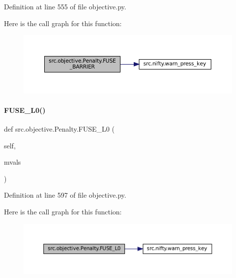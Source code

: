Definition at line 555 of file objective.\+py.

Here is the call graph for this function\+:
\nopagebreak
\begin{figure}[H]
\begin{center}
\leavevmode
\includegraphics[width=350pt]{classsrc_1_1objective_1_1Penalty_abb8686b72c5850e731ec5a96003a9237_cgraph}
\end{center}
\end{figure}
\mbox{\label{classsrc_1_1objective_1_1Penalty_a02a8b3d6848053c479808332cee91777}} 
\paragraph{\texorpdfstring{F\+U\+S\+E\+\_\+\+L0()}{FUSE\_L0()}}
{\footnotesize\ttfamily def src.\+objective.\+Penalty.\+F\+U\+S\+E\+\_\+\+L0 (\begin{DoxyParamCaption}\item[{}]{self,  }\item[{}]{mvals }\end{DoxyParamCaption})}



Definition at line 597 of file objective.\+py.

Here is the call graph for this function\+:
\nopagebreak
\begin{figure}[H]
\begin{center}
\leavevmode
\includegraphics[width=350pt]{classsrc_1_1objective_1_1Penalty_a02a8b3d6848053c479808332cee91777_cgraph}
\end{center}
\end{figure}
\mbox{\label{classsrc_1_1objective_1_1Penalty_a20792a8b530d72cb0cddfde36b3be78d}} 
